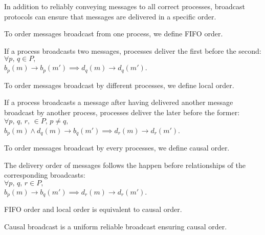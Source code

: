 In addition to reliably conveying messages to all correct processes, broadcast
protocols can ensure that messages are delivered in a specific order.

To order messages broadcast from one process, we define FIFO order.

\begin{definition}
  If a process broadcasts two messages, processes deliver the first before the
  second:\\
  $\forall p,\,q \in P,\,$\\$b_p(m) \rightarrow b_p(m') \implies d_q(m) \rightarrow
  d_q(m')$.
\end{definition}

To order messages broadcast by different processes, we define local order.

\begin{definition}
  If a process broadcasts a message after having delivered another message
  broadcast by another process, processes deliver the later before the former:\\
  $\forall p,\,q,\,r,\, \in P,\,p\neq q,\,$\\$b_p(m) \wedge d_q(m) \rightarrow b_q(m') \implies d_r(m) \rightarrow d_r(m')$.
\end{definition}

To order messages broadcast by every processes, we define causal order.

\begin{definition}
  The delivery order of messages follows the happen before relationships of the
  corresponding broadcasts:\\ $\forall
  p,\,q,\,r \in P,\,$\\$b_p(m) \rightarrow b_q(m') \implies d_r(m) \rightarrow d_r(m')$.
\end{definition}

\begin{theorem}
  FIFO order and local order is equivalent to causal order.
\end{theorem}

\begin{definition}
  Causal broadcast is a uniform reliable broadcast ensuring causal order.
\end{definition}




